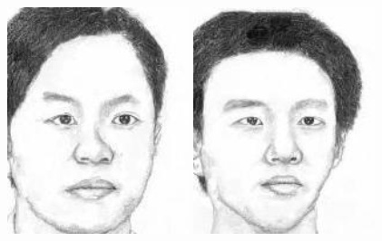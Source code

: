 \documentclass[10pt,twocolumn,letterpaper]{article}
\begin{document}
\begin{figure}[htbp]
{\begin{minipage}[b]{0.22\linewidth}
\includegraphics[width=0.99\linewidth]{img/light&pose_invariance/mrfe_p1.jpg}
\includegraphics[width=0.99\linewidth]{img/light&pose_invariance/mrfe_p2.jpg}

\end{minipage}}
\end{figure}
\end{document}
